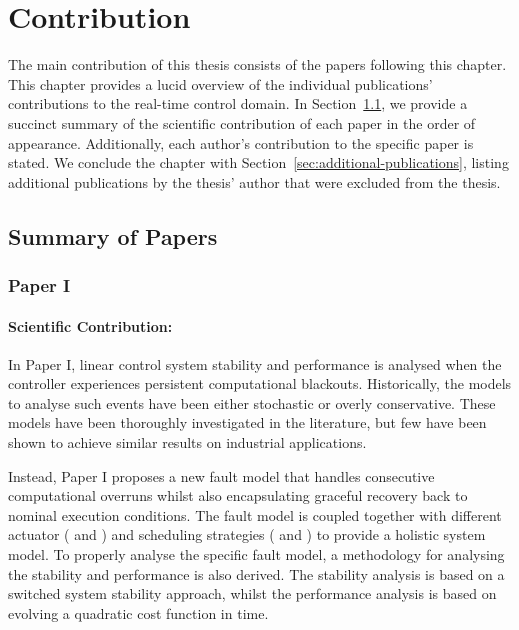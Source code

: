 \chapter{Contribution}

The main contribution of this thesis consists of the  papers following this chapter.
This chapter provides a lucid overview of the individual publications' contributions to the real-time control domain.
In Section~\ref{sec:paper-summaries}, we provide a succinct summary of the scientific contribution of each paper in the order of appearance.
Additionally, each author's contribution to the specific paper is stated.
We conclude the chapter with Section~\ref{sec:additional-publications}, listing additional publications by the thesis' author that were excluded from the thesis.

\clearpage %

\section{Summary of Papers}%
\label{sec:paper-summaries}%
%
\subsection*{Paper I}%
%
\begin{quote}
\end{quote}

\subsubsection*{Scientific Contribution:}%
%
In Paper I, linear control system stability and performance is analysed when the controller experiences persistent computational blackouts.
Historically, the models to analyse such events have been either stochastic or overly conservative.
These models have been thoroughly investigated in the literature, but few have been shown to achieve similar results on industrial applications.

Instead, Paper I proposes a new fault model that handles consecutive computational overruns whilst also encapsulating graceful recovery back to nominal execution conditions.
The fault model is coupled together with different actuator (\tZ{} and \tH{}) and scheduling strategies (\tK{} and \tS{}) to provide a holistic system model.
To properly analyse the specific fault model, a methodology for analysing the stability and performance is also derived.
The stability analysis is based on a switched system stability approach, whilst the performance analysis is based on evolving a quadratic cost function in time.

